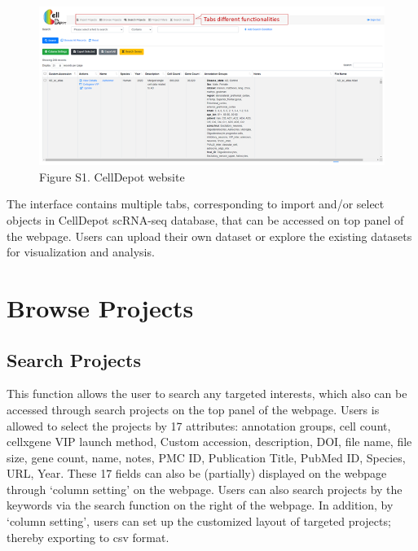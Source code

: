 \documentclass[
]{book}
\begin{document}
\begin{figure}
\centering
\includegraphics{figures/S4.png}
\caption{Figure S1. CellDepot website}
\end{figure}

The interface contains multiple tabs, corresponding to import and/or select objects in CellDepot scRNA-seq database, that can be accessed on top panel of the webpage. Users can upload their own dataset or explore the existing datasets for visualization and analysis.

\hypertarget{browse-projects}{%
\section{Browse Projects}\label{browse-projects}}

\hypertarget{search}{%
\subsection{Search Projects}\label{search}}

This function allows the user to search any targeted interests, which also can be accessed through search projects on the top panel of the webpage. Users is allowed to select the projects by 17 attributes: annotation groups, cell count, cellxgene VIP launch method, Custom accession, description, DOI, file name, file size, gene count, name, notes, PMC ID, Publication Title, PubMed ID, Species, URL, Year. These 17 fields can also be (partially) displayed on the webpage through `column setting' on the webpage. Users can also search projects by the keywords via the search function on the right of the webpage. In addition, by `column setting', users can set up the customized layout of targeted projects; thereby exporting to csv format.
\end{document}
